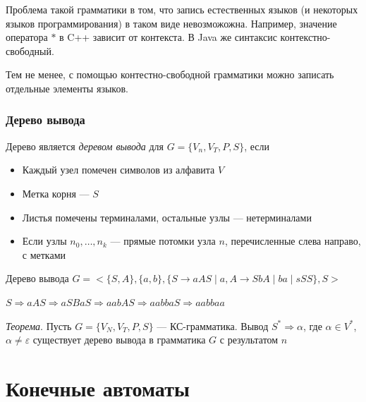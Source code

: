 \documentclass[a4paper, 14pt]{extarticle}
\begin{document}
Проблема такой грамматики в том, что запись естественных языков (и некоторых языков программирования) в таком виде невозможожна. Например, значение оператора $*$ в C++ зависит от контекста. В Java же синтаксис контекстно-свободный.

Тем не менее, с помощью контестно-свободной грамматики можно записать отдельные элементы языков. 

\subsubsection*{Дерево вывода}
Дерево является \textit{деревом вывода} для $G = \{ V_n, V_T, P, S \} $, если
\begin{itemize}
    \item Каждый узел помечен символов из алфавита $V$
    \item Метка корня --- $S$
    \item Листья помечены терминалами, остальные узлы --- нетерминалами
    \item Если узлы $n_0, \ldots, n_k$ --- прямые потомки узла $n$, перечисленные слева направо, с метками
\end{itemize}

\begin{example}{Дерево вывода}
    $ G = < \{ S, A \}, \{ a, b \}, \{ S \rightarrow aAS \mid a, A \rightarrow SbA \mid ba \mid sSS \}, S > $

    $ S \Rightarrow aAS \Rightarrow aSBaS \Rightarrow aabAS \Rightarrow aabbaS \Rightarrow aabbaa $

\end{example}

\begin{tcolorbox}
\textit{Теорема}. Пусть $G = \{V_N, V_T, P, S\}$ --- КС-грамматика. Вывод $S^* \Rightarrow \alpha$, где $\alpha \in V^*$, $\alpha \ne \varepsilon$ существует дерево вывода в грамматика $G$ с результатом $n$
\end{tcolorbox}


\section{Конечные автоматы}
\end{document}
